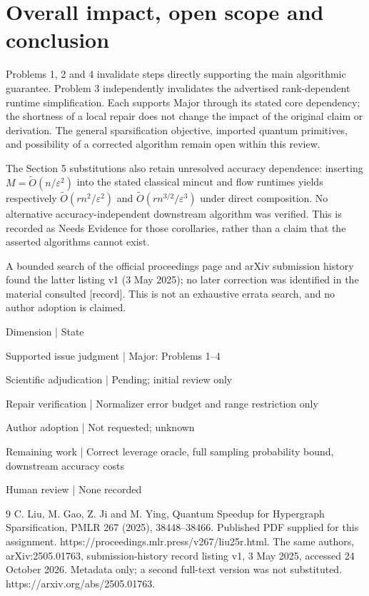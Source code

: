 \documentclass[10pt]{article}
\begin{document}
\section*{Overall impact, open scope and conclusion}
Problems 1, 2 and 4 invalidate steps directly supporting the main algorithmic guarantee. Problem 3 independently invalidates the advertised rank-dependent runtime simplification. Each supports Major through its stated core dependency; the shortness of a local repair does not change the impact of the original claim or derivation. The general sparsification objective, imported quantum primitives, and possibility of a corrected algorithm remain open within this review.\par
The Section 5 substitutions also retain unresolved accuracy dependence: inserting \(M=\widetilde O(n/\varepsilon^2)\) into the stated classical mincut and flow runtimes yields respectively \(\widetilde O(rn^2/\varepsilon^2)\) and \(\widetilde O(rn^{3/2}/\varepsilon^3)\) under direct composition. No alternative accuracy-independent downstream algorithm was verified. This is recorded as Needs Evidence for those corollaries, rather than a claim that the asserted algorithms cannot exist.\par
A bounded search of the official proceedings page and arXiv submission history found the latter listing v1 (3 May 2025); no later correction was identified in the material consulted [record]. This is not an exhaustive errata search, and no author adoption is claimed.\par
Dimension | State\par
Supported issue judgment | Major: Problems 1–4\par
Scientific adjudication | Pending; initial review only\par
Repair verification | Normalizer error budget and range restriction only\par
Author adoption | Not requested; unknown\par
Remaining work | Correct leverage oracle, full sampling probability bound, downstream accuracy costs\par
Human review | None recorded\par
9 C. Liu, M. Gao, Z. Ji and M. Ying, Quantum Speedup for Hypergraph Sparsification, PMLR 267 (2025), 38448–38466. Published PDF supplied for this assignment. https://proceedings.mlr.press/v267/liu25r.html. The same authors, arXiv:2505.01763, submission-history record listing v1, 3 May 2025, accessed 24 October 2026. Metadata only; a second full-text version was not substituted. https://arxiv.org/abs/2505.01763.\par
\end{document}
